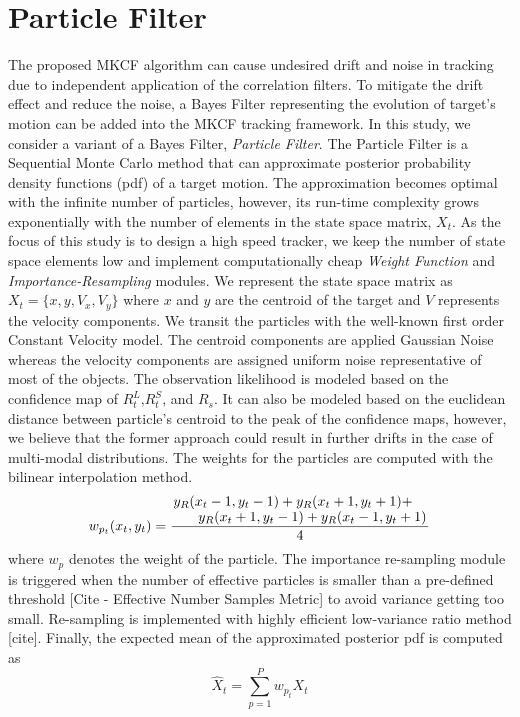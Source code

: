 \documentclass[10pt,twocolumn,letterpaper]{article}
\newcounter{ct}
\begin{document}
\section{Particle Filter}
\label{sc:PF}
The proposed MKCF algorithm can cause undesired drift and noise in
tracking due to independent application of the correlation filters. To
mitigate the drift effect and reduce the noise, a Bayes Filter
representing the evolution of target's motion can be added into the
MKCF tracking framework. In this study, we consider a variant of a
Bayes Filter, \textit{Particle Filter}. The Particle Filter is a
Sequential Monte Carlo method that can approximate posterior
probability density functions (pdf) of a target motion. The
approximation becomes optimal with the infinite number of particles,
however, its run-time complexity grows exponentially with the number
of elements in the state space matrix, $X_{t}$. As the focus of this
study is to design a high speed tracker, we keep the number of state
space elements low and implement computationally cheap \textit{Weight
  Function} and \textit{Importance-Resampling} modules. We represent
the state space matrix as $X_{t} = \lbrace x,y,V_{x},V_{y}\rbrace$
where $x$ and $y$ are the centroid of the target and $V$ represents
the velocity components. We transit the particles with the well-known
first order Constant Velocity model. The centroid components are
applied Gaussian Noise whereas the velocity components are assigned
uniform noise representative of most of the objects. The observation
likelihood is modeled based on the confidence map of
$R_{t}^{L}$,$R_{t}^{S}$, and $R_{s}$. It can also be modeled based on
the euclidean distance between particle's centroid to the peak of the
confidence maps, however, we believe that the former approach could
result in further drifts in the case of multi-modal distributions. The
weights for the particles are computed with the bilinear interpolation
method.
\begin{equation}
	w_{p_{t}}(x_{t},y_{t}) = \dfrac{\splitfrac{y_{R}(x_{t}-1,y_{t}-1)+y_{R}(x_{t}+1,y_{t}+1)+}{y_{R}(x_{t}+1,y_{t}-1)+y_{R}(x_{t}-1,y_{t}+1)}}{4}
\end{equation}
where $w_{p}$ denotes the weight of the particle. The importance
re-sampling module is triggered when the number of effective particles
is smaller than a pre-defined threshold [Cite - Effective Number
  Samples Metric] to avoid variance getting too small. Re-sampling is
implemented with highly efficient low-variance ratio method
[cite]. Finally, the expected mean of the approximated posterior pdf
is computed as
\begin{equation}
	\hat{X}_{t} = \sum_{p=1}^{P}w_{p_{t}} X_{t}
\end{equation}
\end{document}
